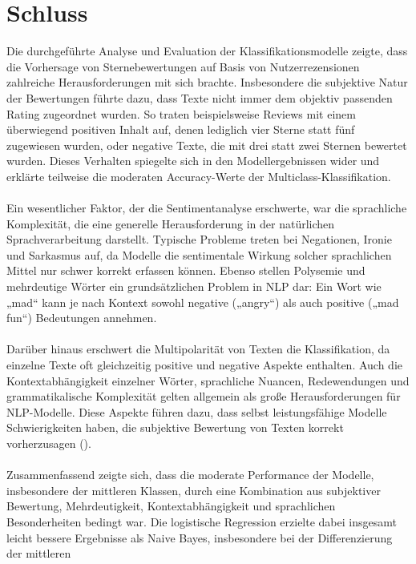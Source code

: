 \chapter{Schluss}
Die durchgeführte Analyse und Evaluation der Klassifikationsmodelle zeigte, 
dass die Vorhersage von Sternebewertungen auf Basis von Nutzerrezensionen 
zahlreiche Herausforderungen mit sich brachte. Insbesondere die subjektive 
Natur der Bewertungen führte dazu, dass Texte nicht immer dem objektiv passenden 
Rating zugeordnet wurden. So traten beispielsweise Reviews mit einem überwiegend 
positiven Inhalt auf, denen lediglich vier Sterne statt fünf zugewiesen wurden, 
oder negative Texte, die mit drei statt zwei Sternen bewertet wurden. Dieses 
Verhalten spiegelte sich in den Modellergebnissen wider und erklärte teilweise 
die moderaten Accuracy-Werte der Multiclass-Klassifikation.\\
\\
\noindent Ein wesentlicher Faktor, der die Sentimentanalyse erschwerte, war die 
sprachliche Komplexität, die eine generelle Herausforderung in der natürlichen 
Sprachverarbeitung darstellt. Typische Probleme treten bei Negationen, 
Ironie und Sarkasmus auf, da Modelle die sentimentale Wirkung solcher 
sprachlichen Mittel nur schwer korrekt erfassen können. Ebenso stellen 
Polysemie und mehrdeutige Wörter ein grundsätzlichen Problem in NLP dar: Ein 
Wort wie „mad“ kann je nach Kontext sowohl negative („angry“) als auch positive 
(„mad fun“) Bedeutungen annehmen.\\
\\
\noindent Darüber hinaus erschwert die Multipolarität von Texten die Klassifikation, da 
einzelne Texte oft gleichzeitig positive und negative Aspekte enthalten. Auch 
die Kontextabhängigkeit einzelner Wörter, sprachliche Nuancen, Redewendungen 
und grammatikalische Komplexität gelten allgemein als große Herausforderungen 
für NLP-Modelle. Diese Aspekte führen dazu, dass selbst leistungsfähige Modelle 
Schwierigkeiten haben, die subjektive Bewertung von Texten korrekt vorherzusagen 
(\cite{qualtrics2024}).\\
\\
\noindent Zusammenfassend zeigte sich, dass die moderate Performance der Modelle, 
insbesondere der mittleren Klassen, durch eine Kombination aus subjektiver 
Bewertung, Mehrdeutigkeit, Kontextabhängigkeit und sprachlichen Besonderheiten 
bedingt war. Die logistische Regression erzielte dabei insgesamt leicht bessere 
Ergebnisse als Naive Bayes, insbesondere bei der Differenzierung der mittleren 
